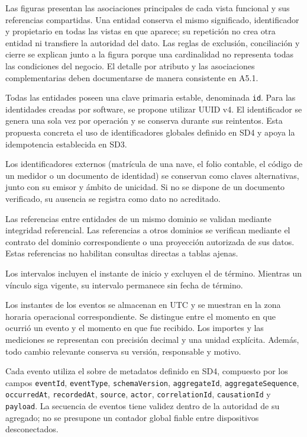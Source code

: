 Las figuras presentan las asociaciones principales de cada vista funcional y sus referencias compartidas. Una entidad conserva el mismo significado, identificador y propietario en todas las vistas en que aparece; su repetición no crea otra entidad ni transfiere la autoridad del dato. Las reglas de exclusión, conciliación y cierre se explican junto a la figura porque una cardinalidad no representa todas las condiciones del negocio. El detalle por atributo y las asociaciones complementarias deben documentarse de manera consistente en A5.1.

Todas las entidades poseen una clave primaria estable, denominada \texttt{id}. Para las identidades creadas por software, se propone utilizar UUID v4. El identificador se genera una sola vez por operación y se conserva durante sus reintentos. Esta propuesta concreta el uso de identificadores globales definido en SD4 y apoya la idempotencia establecida en SD3.

Los identificadores externos (matrícula de una nave, el folio contable, el código de un medidor o un documento de identidad) se conservan como claves alternativas, junto con su emisor y ámbito de unicidad. Si no se dispone de un documento verificado, su ausencia se registra como dato no acreditado.

Las referencias entre entidades de un mismo dominio se validan mediante integridad referencial. Las referencias a otros dominios se verifican mediante el contrato del dominio correspondiente o una proyección autorizada de sus datos. Estas referencias no habilitan consultas directas a tablas ajenas.

Los intervalos incluyen el instante de inicio y excluyen el de término. Mientras un vínculo siga vigente, su intervalo permanece sin fecha de término.

Los instantes de los eventos se almacenan en UTC y se muestran en la zona horaria operacional correspondiente. Se distingue entre el momento en que ocurrió un evento y el momento en que fue recibido. Los importes y las mediciones se representan con precisión decimal y una unidad explícita. Además, todo cambio relevante conserva su versión, responsable y motivo.

Cada evento utiliza el sobre de metadatos definido en SD4, compuesto por los campos \texttt{eventId}, \texttt{eventType}, \texttt{schemaVersion}, \texttt{aggregateId}, \texttt{aggregateSequence}, \texttt{occurredAt}, \texttt{recordedAt}, \texttt{source}, \texttt{actor}, \texttt{correlationId}, \texttt{causationId} y \texttt{payload}. La secuencia de eventos tiene validez dentro de la autoridad de su agregado; no se presupone un contador global fiable entre dispositivos desconectados.


